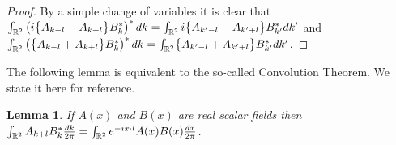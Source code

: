 \documentclass[noinfoline]{imsart}
\newtheorem{lemma}{Lemma}
\begin{document}
\begin{proof}
By a simple change of variables it is clear that 
$\int_{\Bbb R^2} \left(i\bigl\{ A_{k-l}  -   A_{k+l}  \bigr\} B^*_k\right)^* dk = \int_{\Bbb R^2} i\bigl\{ A_{k^\prime-l} - A_{k^\prime+l}  \bigr\} B_{k^\prime}^* dk^\prime$ and $\int_{\Bbb R^2} \left(\bigl\{  A_{k-l}  +    A_{k+l}   \bigr\} B^*_k \right)^* dk  = \int_{\Bbb R^2} \bigl\{ A_{k^\prime-l} + A_{k^\prime+l}  \bigr\} B_{k^\prime}^* dk^\prime$.


\end{proof}



The following lemma is equivalent to the so-called Convolution Theorem. We state it here for reference.
\begin{lemma} 
\label{conv}
If $A(x)$ and $B(x)$ are real scalar fields then  $\int_{\Bbb R^2} A_{k+l}  B^*_k \frac{dk}{2\pi}= \int_{\Bbb R^2} e^{-ix\cdot l} A(x)B(x)\frac{dx}{2\pi}$.
\end{lemma}

\end{document}
